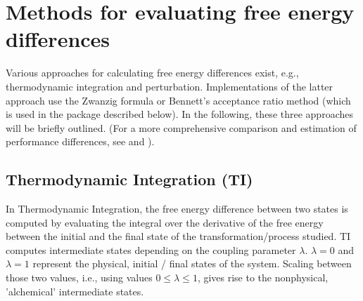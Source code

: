 \section{Methods for evaluating free energy differences}

Various approaches for calculating free energy differences exist,
e.g., thermodynamic integration and perturbation. Implementations of the latter approach use
the Zwanzig formula or Bennett's acceptance ratio method (which is
used in the {\trafo} package described below). In the following,
these three approaches will be briefly outlined. (For a more
comprehensive comparison and estimation of performance differences,
see \cite{Bruckner.2011} and \cite{Ruiter.2013}).

\subsection{Thermodynamic Integration (TI)}

In Thermodynamic Integration\cite{Kirkwood.1935}, the free energy difference between two
states is computed by evaluating the integral over the derivative of the free energy
between the initial and the final state of the transformation/process studied. TI computes intermediate
states depending on the coupling parameter $\lambda$. $\lambda=0$
and $\lambda=1$ represent the physical, initial / final states of
the system. Scaling between those two values, i.e., using values $0\le\lambda\le1$,
gives rise to the nonphysical, 'alchemical' intermediate states.

